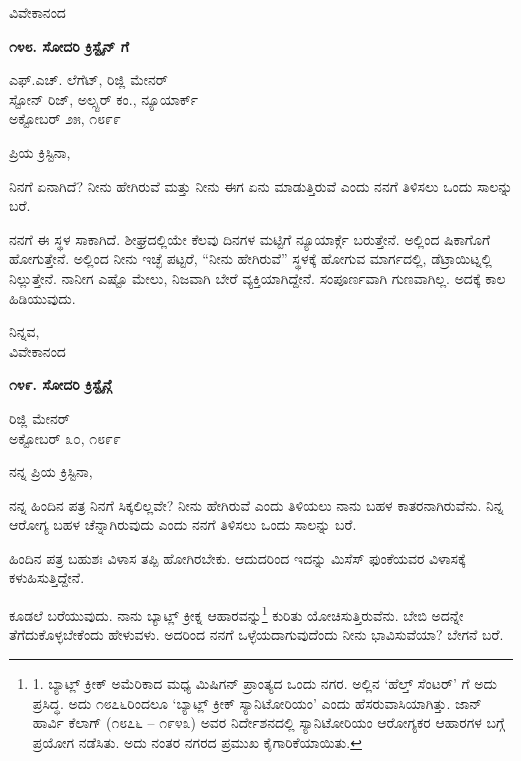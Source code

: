 \begin{center}
ವಿವೇಕಾನಂದ
\end{center}

\begin{center}
\textbf{೧೪೮. ಸೋದರಿ ಕ್ರಿಸ್ಟೈನ್ ಗೆ}
\end{center}

\begin{flushright}
 ಎಫ್.ಎಚ್. ಲೆಗೆಟ್, ರಿಜ್ಲಿ ಮೇನರ್\\ಸ್ಟೋನ್ ರಿಜ್, ಅಲ್ಸ್ಟರ್ ಕಂ., ನ್ಯೂಯಾರ್ಕ್\\ಅಕ್ಟೋಬರ್ ೨೫, ೧೮೯೯
\end{flushright}

ಪ್ರಿಯ ಕ್ರಿಸ್ಟಿನಾ,

ನಿನಗೆ ಏನಾಗಿದೆ? ನೀನು ಹೇಗಿರುವೆ ಮತ್ತು ನೀನು ಈಗ ಏನು ಮಾಡುತ್ತಿರುವೆ ಎಂದು ನನಗೆ ತಿಳಿಸಲು ಒಂದು ಸಾಲನ್ನು ಬರೆ.

ನನಗೆ ಈ ಸ್ಥಳ ಸಾಕಾಗಿದೆ. ಶೀಘ್ರದಲ್ಲಿಯೇ ಕೆಲವು ದಿನಗಳ ಮಟ್ಟಿಗೆ ನ್ಯೂಯಾರ್ಕ್ಗೆ ಬರುತ್ತೇನೆ. ಅಲ್ಲಿಂದ ಷಿಕಾಗೊಗೆ ಹೋಗುತ್ತೇನೆ. ಅಲ್ಲಿಂದ ನೀನು ಇಚ್ಛೆ ಪಟ್ಟರೆ, “ನೀನು ಹೇಗಿರುವೆ” ಸ್ಥಳಕ್ಕೆ ಹೋಗುವ ಮಾರ್ಗದಲ್ಲಿ, ಡೆಟ್ರಾಯಿಟ್ನಲ್ಲಿ ನಿಲ್ಲುತ್ತೇನೆ. ನಾನೀಗ ಎಷ್ಟೊ ಮೇಲು, ನಿಜವಾಗಿ ಬೇರೆ ವ್ಯಕ್ತಿಯಾಗಿದ್ದೇನೆ. ಸಂಪೂರ್ಣವಾಗಿ ಗುಣವಾಗಿಲ್ಲ. ಅದಕ್ಕೆ ಕಾಲ ಹಿಡಿಯುವುದು.

\begin{flushright}
ನಿನ್ನವ,\\ವಿವೇಕಾನಂದ
\end{flushright}

\begin{center}
\textbf{೧೪೯. ಸೋದರಿ ಕ್ರಿಸ್ಟೈನ್ಗೆ}
\end{center}

\begin{flushright}
ರಿಜ್ಲಿ ಮೇನರ್\\ಅಕ್ಟೋಬರ್ ೩೦, ೧೮೯೯
\end{flushright}

ನನ್ನ ಪ್ರಿಯ ಕ್ರಿಸ್ಟಿನಾ,

ನನ್ನ ಹಿಂದಿನ ಪತ್ರ ನಿನಗೆ ಸಿಕ್ಕಲಿಲ್ಲವೇ? ನೀನು ಹೇಗಿರುವೆ ಎಂದು ತಿಳಿಯಲು ನಾನು ಬಹಳ ಕಾತರನಾಗಿರುವೆನು. ನಿನ್ನ ಆರೋಗ್ಯ ಬಹಳ ಚೆನ್ನಾಗಿರುವುದು ಎಂದು ನನಗೆ ತಿಳಿಸಲು ಒಂದು ಸಾಲನ್ನು ಬರೆ.

ಹಿಂದಿನ ಪತ್ರ ಬಹುಶಃ ವಿಳಾಸ ತಪ್ಪಿ ಹೋಗಿರಬೇಕು. ಆದುದರಿಂದ ಇದನ್ನು ಮಿಸೆಸ್ ಫುಂಕೆಯವರ ವಿಳಾಸಕ್ಕೆ ಕಳುಹಿಸುತ್ತಿದ್ದೇನೆ.

ಕೂಡಲೆ ಬರೆಯುವುದು. ನಾನು ಬ್ಯಾಟ್ಲ್ ಕ್ರೀಕ್ನ ಆಹಾರವನ್ನು\footnote{1. ಬ್ಯಾಟ್ಲ್ ಕ್ರೀಕ್ ಅಮೆರಿಕಾದ ಮಧ್ಯ ಮಿಷಿಗನ್ ಪ್ರಾಂತ್ಯದ ಒಂದು ನಗರ. ಅಲ್ಲಿನ ‘ಹೆಲ್ತ್ ಸೆಂಟರ್’ ಗೆ ಅದು ಪ್ರಸಿದ್ಧ. ಅದು ೧೮೭೬ರಿಂದಲೂ ‘ಬ್ಯಾಟ್ಲ್ ಕ್ರೀಕ್ ಸ್ಯಾನಿಟೋರಿಯಂ’ ಎಂದು ಹೆಸರುವಾಸಿಯಾಗಿತ್ತು. ಜಾನ್ ಹಾರ್ವಿ ಕೆಲಾಗ್ (೧೮೭೬ – ೧೯೪೩) ಅವರ ನಿರ್ದೇಶನದಲ್ಲಿ ಸ್ಯಾನಿಟೋರಿಯಂ ಆರೋಗ್ಯಕರ ಆಹಾರಗಳ ಬಗ್ಗೆ ಪ್ರಯೋಗ ನಡೆಸಿತು. ಅದು ನಂತರ ನಗರದ ಪ್ರಮುಖ ಕೈಗಾರಿಕೆಯಾಯಿತು.} ಕುರಿತು ಯೋಚಿಸುತ್ತಿರುವೆನು. ಬೇಬಿ ಅದನ್ನೇ ತೆಗೆದುಕೊಳ್ಳಬೇಕೆಂದು ಹೇಳುವಳು. ಅದರಿಂದ ನನಗೆ ಒಳ್ಳೆಯದಾಗುವುದೆಂದು ನೀನು ಭಾವಿಸುವೆಯಾ? ಬೇಗನೆ ಬರೆ.

